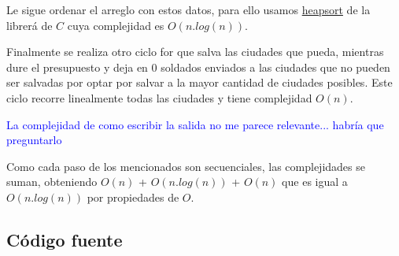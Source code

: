 \documentclass[a4paper]{article}
\begin{document}
Le sigue ordenar el arreglo con estos datos, para ello usamos \href{(http://www.cplusplus.com/reference/algorithm/sort_heap/?kw=sort_heap)}{heapsort} de la librer\'a de $C$ cuya complejidad es $O(n.log(n))$.

Finalmente se realiza otro ciclo for que salva las ciudades que pueda, mientras dure el presupuesto y deja en 0 soldados enviados a las ciudades que no pueden ser salvadas por optar por salvar a la mayor cantidad de ciudades posibles. Este ciclo recorre linealmente todas las ciudades y tiene complejidad $O(n)$.

\textcolor{blue}{La complejidad de como escribir la salida no me parece relevante... habr\'ia que preguntarlo}

Como cada paso de los mencionados son secuenciales, las complejidades se suman, obteniendo $O(n)$ + $O(n.log(n))$ + $O(n)$ que es igual a $O(n.log(n))$ por propiedades de $O$.

%
%
%
%

\newpage

\subsection{C\'odigo fuente}

\begin{algorithm}[h!]
\NoCaptionOfAlgo
\caption{Ejemplo de Algoritmo}
\end{algorithm}
\end{document}
